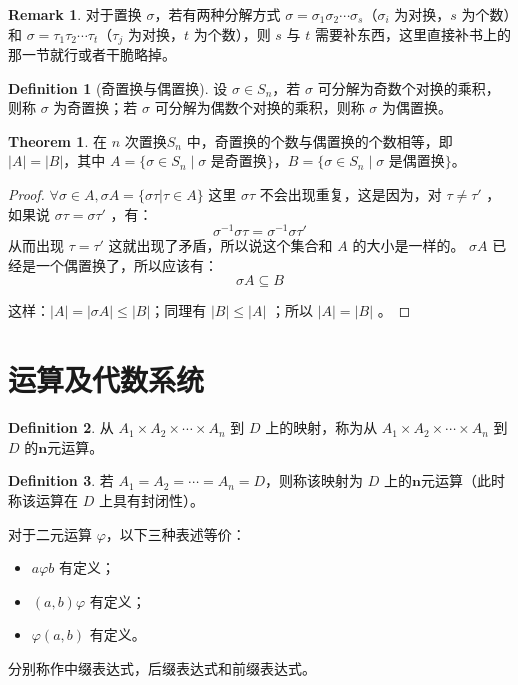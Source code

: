 \documentclass[oneside]{book}
\theoremstyle{definition}
\newtheorem{definition}{Definition}[section]
\newtheorem{theorem}{Theorem}[section]
\newtheorem{remark}{Remark}[section]
\begin{document}
	\begin{remark}
		对于置换 \( \sigma \)，若有两种分解方式 \( \sigma = \sigma_1 \sigma_2 \cdots \sigma_s \)（\( \sigma_i \) 为对换，\( s \) 为个数）和 \( \sigma = \tau_1 \tau_2 \cdots \tau_t \)（\( \tau_j \) 为对换，\( t \) 为个数），则 \( s \) 与 \( t \) 
		需要补东西，这里直接补书上的那一节就行或者干脆略掉。
	\end{remark}
	
	\begin{definition}[奇置换与偶置换]
		设 \( \sigma \in S_n \)，若 \( \sigma \) 可分解为奇数个对换的乘积，则称 \( \sigma \) 为奇置换；若 \( \sigma \) 可分解为偶数个对换的乘积，则称 \( \sigma \) 为偶置换。
	\end{definition}
	
	
	
	\begin{theorem}
		在 $n$ 次置换\( S_n \) 中，奇置换的个数与偶置换的个数相等，即 \( |A| = |B| \)，其中 \( A = \{ \sigma \in S_n \mid \sigma \text{ 是奇置换} \} \)，\( B = \{ \sigma \in S_n \mid \sigma \text{ 是偶置换} \} \)。
	\end{theorem}
	
	\begin{proof}
		\( \forall \sigma \in A , \sigma A=\{ \sigma \tau| \tau \in A \}\)
		这里 \( \sigma\tau \) 不会出现重复，这是因为，对 \(\tau\neq\tau'\) ，如果说 \( \sigma\tau=\sigma\tau'\) ，有：
		\[
		 \sigma^{-1}\sigma\tau=\sigma^{-1}\sigma\tau'
		 \]
		 从而出现 \(\tau=\tau'\)
		 这就出现了矛盾，所以说这个集合和 \( A \) 的大小是一样的。
		 \( \sigma A \) 已经是一个偶置换了，所以应该有：
		 \[ \sigma A \subseteq B\]
		 
		 这样：\( |A| =|\sigma A|\leq |B|\)；同理有 \(|B|\leq |A|\) ；所以 \( |A|=|B|\) 。
	\end{proof}
	\section{运算及代数系统}
	
	\begin{definition}
		从 \( A_1 \times A_2 \times \cdots \times A_n \) 到 \( D \) 上的映射，称为从 \( A_1 \times A_2 \times \cdots \times A_n \) 到 \( D \) 的\(\boldsymbol{n}\)元运算。
	\end{definition}
	\begin{definition}
		若 \( A_1 = A_2 = \cdots = A_n = D \)，则称该映射为 \( D \) 上的\(\boldsymbol{n}\)元运算（此时称该运算在 \( D \) 上具有封闭性）。
		
		对于二元运算 \( \varphi \)，以下三种表述等价：
		\begin{itemize}
			\item \( a \varphi b \) 有定义；
			\item \( (a, b)\varphi \) 有定义；
			\item \( \varphi(a, b) \) 有定义。
		\end{itemize}
		
		分别称作中缀表达式，后缀表达式和前缀表达式。
	\end{definition}
	
\end{document}
